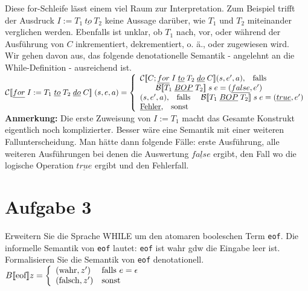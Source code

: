 \documentclass[ngerman,a4paper]{report}
\begin{document}
Diese for-Schleife lässt einem viel Raum zur Interpretation. Zum Beispiel trifft der Ausdruck $I:=T_1\ \underline{to}\ T_2$ keine Aussage darüber, wie $T_1$ und $T_2$ miteinander verglichen werden. Ebenfalls ist unklar, ob $T_1$ nach, vor, oder während der Ausführung von $C$ inkrementiert, dekrementiert, o. ä., oder zugewiesen wird.\\
Wir gehen davon aus, das folgende denotationelle Semantik - angelehnt an die While-Definition - ausreichend ist.\\
$		\mathcal{C}
[\![\underline{for}\;I:=T_1\;\underline{to}\;T_2\;\underline{do}\;C]\!]\;(s,e,a) = \left\lbrace\begin{array}{l l} \mathcal{C}
[\![C;\underline{for}\;I\;\underline{to}\;T_2\;\underline{do}\;C]\!](s,e',a)\text{,}\quad\text{falls }\\\quad\quad\mathcal{B}
[\![T_1\;\underline{BOP}\;T_2]\!]\;s\;e= (\underline{false},e')\\
(s,e',a)\text{,}\quad\text{falls }\quad\mathcal{B}[\![T_1\;\underline{BOP}\;T_2]\!]\;s\;e= (\underline{true},e')\\
		\underline{\text{Fehler}}\text{,}\quad\text{sonst} \end{array}\right.$\\
		
\textbf{Anmerkung:} Die erste Zuweisung von $I:=T_1$ macht das Gesamte Konstrukt eigentlich noch komplizierter. Besser wäre eine Semantik mit einer weiteren Fallunterscheidung. Man hätte dann folgende Fälle: erste Ausführung, alle weiteren Ausführungen bei denen die Auswertung $\underline{false}$ ergibt, den Fall wo die logische Operation $\underline{true}$ ergibt und den Fehlerfall.\\

\section*{Aufgabe 3}
Erweitern Sie die Sprache WHILE um den atomaren booleschen Term \lstinline!eof!. Die informelle Semantik von \lstinline!eof! lautet: \lstinline!eof! ist wahr gdw die Eingabe leer ist.\\
Formalisieren Sie die Semantik von \lstinline!eof! denotationell.\\

%
%
%
$ B \llbracket\text{eof} \rrbracket z = \left\lbrace\begin{array}{l l}
(\text{wahr},z') & \text{falls } e = \epsilon\\
(\text{falsch},z') & \text{sonst}
\end{array}\right.$
\end{document}
